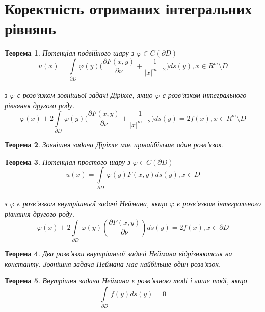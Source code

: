 \documentclass[a4 paper,12pt,ukrainian]{report}
\newtheorem{theorem}{\textbf{Теорема}}[chapter]
\begin{document}
\section{Коректність отриманих інтегральних рівнянь}
\begin{theorem}\cite{Kress}
Потенціал подвійного шару з $\varphi \in C(\partial D)$
\begin{equation*}
u(x) = \int\limits_{\partial D} \, \varphi(y) \bigg(\frac{\partial F(x,y)}{\partial \nu} + \frac{1}{|x|^{m-2}}\bigg)ds(y), x \in R^m \setminus D
\end{equation*}
\\ з $\varphi$ є розв'язком зовнішьої задачі Діріхле, якщо $\varphi$ є розв'язком інтегрального рівняння другого роду.
\begin{equation}
\varphi(x) + 2\int\limits_{\partial D} \, \varphi(y) \bigg(\frac{\partial F(x,y)}{\partial \nu} + \frac{1}{|x|^{m-2}}\bigg)ds(y) = 2f(x), x \in R^m \setminus D
\end{equation}
\end{theorem}

\begin{theorem}\cite{Kress}
Зовнішня задача Діріхле має щонайбільше один розв'язок.
\end{theorem}


\begin{theorem}\cite{Kress}
Потенціал простого шару з $\varphi \in C(\partial D)$
\begin{equation*}
u(x) = \int\limits_{\partial D} \, \varphi(y) F(x,y)ds(y), x \in  D
\end{equation*}
\\ з $\varphi$ є розв'язком внутрішньої задачі Неймана, якщо $\varphi$ є розв'язком інтегрального рівняння другого роду.
\begin{equation}
\varphi(x) + 2\int\limits_{\partial D} \, \varphi(y) (\frac{\partial F(x,y)}{\partial \nu})ds(y) = 2f(x), x \in \partial D
\end{equation}
\end{theorem}

\begin{theorem}\cite{Kress}
Два розв'язки внутрішньої задачі Неймана відрізняютсья на константу.
Зовнішня задача Неймана має найбільше один розв'язок.
\end{theorem}

\begin{theorem}\cite{Kress}
Внутрішня задача Неймана є розв'язною тоді і лише тоді, якщо
\begin{equation*}
\int\limits_{\partial D} \, f(y)ds(y) = 0
\end{equation*}
\end{theorem}
\end{document}
